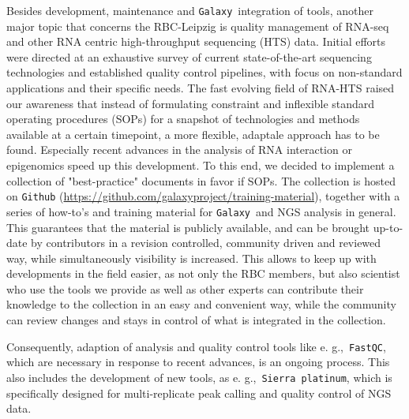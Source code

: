 \documentclass{article}
\newcommand{\gal}{\texttt{Galaxy}\, }
\newcommand{\eg}{e. g.,\, }
\begin{document}
Besides development, maintenance and \gal integration of tools,
another major topic that concerns the RBC-Leipzig is quality
management of RNA-seq and other RNA centric high-throughput sequencing
(HTS) data. Initial efforts were directed at an exhaustive survey of
current state-of-the-art sequencing technologies and established
quality control pipelines, with focus on non-standard applications and
their specific needs. The fast evolving field of RNA-HTS raised our
awareness that instead of formulating constraint and inflexible
standard operating procedures (SOPs) for a snapshot of technologies
and methods available at a certain timepoint, a more flexible,
adaptale approach has to be found. Especially recent advances in the
analysis of RNA interaction or epigenomics speed up this
development. To this end, we decided to implement a collection of
"best-practice" documents in favor if SOPs. The collection is hosted
on \texttt{Github}
(\href{https://github.com/galaxyproject/training-material}{https://github.com/galaxyproject/training-material}),
together with a series of how-to's and training material for \gal and
NGS analysis in general.  This guarantees that the material is
publicly available, and can be brought up-to-date by contributors in a
revision controlled, community driven and reviewed way, while
simultaneously visibility is increased. This allows to keep up with
developments in the field easier, as not only the RBC members, but
also scientist who use the tools we provide as well as other experts
can contribute their knowledge to the collection in an easy and
convenient way, while the community can review changes and stays in
control of what is integrated in the collection.

Consequently, adaption of analysis and quality control tools like \eg
\texttt{FastQC}, which are necessary in response to recent advances,
is an ongoing process. This also includes the development of new
tools, as \eg \texttt{Sierra platinum}, which is specifically designed
for multi-replicate peak calling and quality control of NGS data.
\end{document}
